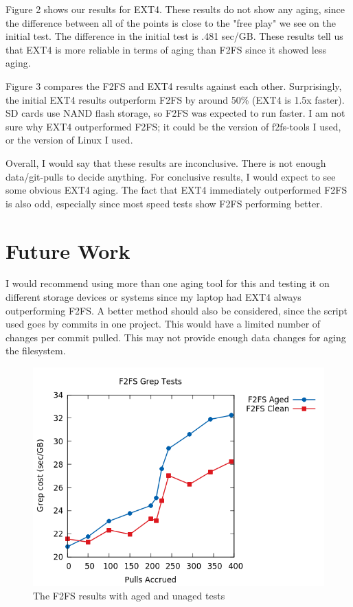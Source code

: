 \documentclass[a4paper, 10pt, conference]{ieeeconf}
\begin{document}
Figure 2 shows our results for EXT4. These results do not show any aging, 
since the difference between all of the points is close to the "free play" we
see on the initial test. The difference in the initial test is .481 sec/GB. 
These results tell us that EXT4 is more reliable in terms of aging than F2FS
since it showed less aging.

Figure 3 compares the F2FS and EXT4 results against each other. Surprisingly,
the initial EXT4 results outperform F2FS by around 50\% (EXT4 is 1.5x faster).
SD cards use NAND flash storage, so F2FS was expected to run faster. I am not
sure why EXT4 outperformed F2FS; it could be the version of f2fs-tools I used,
or the version of Linux I used. 

Overall, I would say that these results are inconclusive. There is not enough
data/git-pulls to decide anything. For conclusive results, I would expect to 
see some obvious EXT4 aging. The fact that EXT4 immediately outperformed F2FS
is also odd, especially since most speed tests show F2FS performing better. 


\section{Future Work}

I would recommend using more than one aging tool for this and testing it on different
storage devices or systems since my laptop had EXT4 always outperforming F2FS. A better
method should also be considered, since the script used goes by commits in one project.
This would have a limited number of changes per commit pulled. This may not provide enough
data changes for aging the filesystem.

\begin{figure}
	\includegraphics[width=\linewidth]{f2fs_aged.png}
	\caption{The F2FS results with aged and unaged tests}
	\label{fig:f2fs}
\end{figure}
\end{document}
